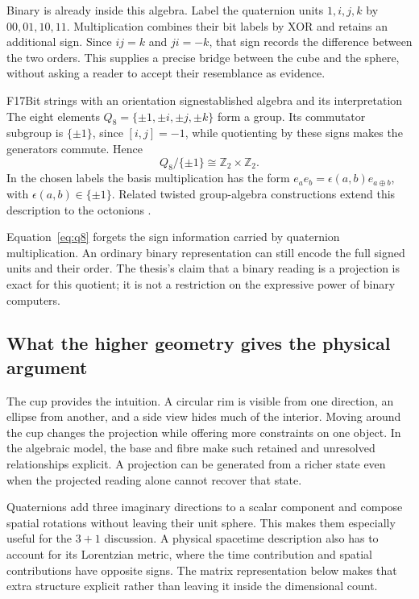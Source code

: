\documentclass[11pt,a4paper]{article}
\newcommand{\Z}{\mathbb{Z}}
\begin{document}
Binary is already inside this algebra. Label the quaternion units $1,i,j,k$
by $00,01,10,11$. Multiplication combines their bit labels by XOR and retains
an additional sign. Since $ij=k$ and $ji=-k$, that sign records the difference
between the two orders. This supplies a precise bridge between the cube and
the sphere, without asking a reader to accept their resemblance as evidence.

\begin{formal}{F17}{Bit strings with an orientation sign}{established algebra and its interpretation}
The eight elements $Q_8=\{\pm1,\pm i,\pm j,\pm k\}$ form a group.
Its commutator subgroup is $\{\pm1\}$, since $[i,j]=-1$, while quotienting
by these signs makes the generators commute. Hence
\begin{equation}\label{eq:q8}
 Q_8/\{\pm1\}\cong\Z_2\times\Z_2.
\end{equation}
In the chosen labels the basis multiplication has the form
$e_ae_b=\epsilon(a,b)e_{a\oplus b}$, with $\epsilon(a,b)\in\{\pm1\}$.
Related twisted group-algebra constructions extend this description to the
octonions \citep{AlbuquerqueMajid1998}.

Equation~\eqref{eq:q8} forgets the sign information carried by quaternion
multiplication. An ordinary binary representation can still encode the full
signed units and their order. The thesis's claim that a binary reading is a
projection is exact for this quotient; it is not a restriction on the
expressive power of binary computers.
\end{formal}

\subsection{What the higher geometry gives the physical argument}
The cup provides the intuition. A circular rim is visible from one direction,
an ellipse from another, and a side view hides much of the interior. Moving
around the cup changes the projection while offering more constraints on one
object. In the algebraic model, the base and fibre make such retained and
unresolved relationships explicit. A projection can be generated from a
richer state even when the projected reading alone cannot recover that state.

Quaternions add three imaginary directions to a scalar component and compose
spatial rotations without leaving their unit sphere. This makes them especially
useful for the $3+1$ discussion. A physical spacetime description also has to
account for its Lorentzian metric, where the time contribution and spatial
contributions have opposite signs. The matrix representation below makes that
extra structure explicit rather than leaving it inside the dimensional count.
\end{document}
